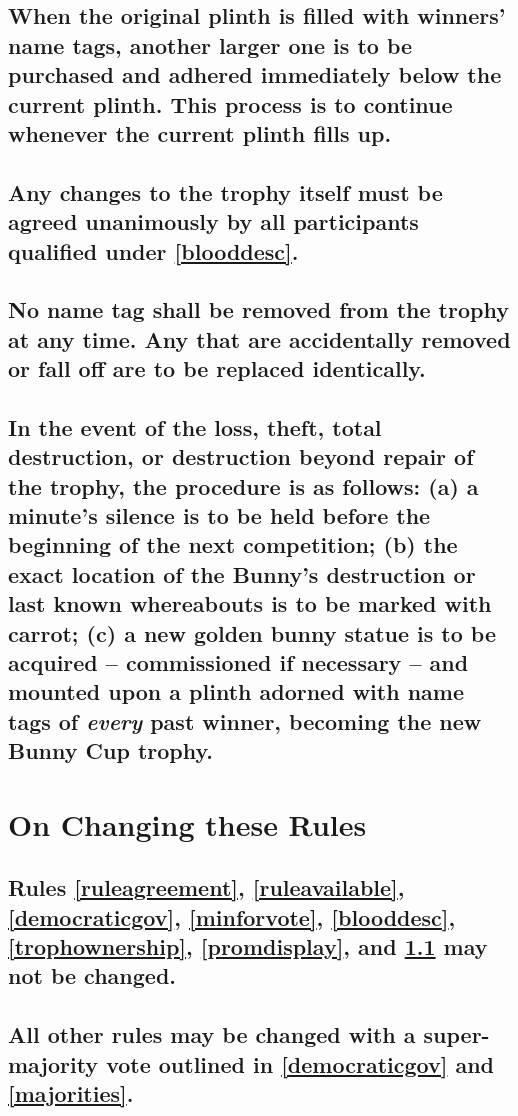 \documentclass[a4paper]{article}
\begin{document}
\subsection{When the original plinth is filled with winners’ name tags, another larger one is to be purchased and adhered immediately below the current plinth. This process is to continue whenever the current plinth fills up.}
\subsection{Any changes to the trophy itself must be agreed unanimously by all participants qualified under \ref{blooddesc}.}
\subsection{No name tag shall be removed from the trophy at any time. Any that are accidentally removed or fall off are to be replaced identically.}
\subsection{In the event of the loss, theft, total destruction, or destruction beyond repair of the trophy, the procedure is as follows: (a) a minute's silence is to be held before the beginning of the next competition; (b) the exact location of the Bunny's destruction or last known whereabouts is to be marked with carrot; (c) a new golden bunny statue is to be acquired – commissioned if necessary – and mounted upon a plinth adorned with name tags of \emph{every} past winner, becoming the new Bunny Cup trophy.}




\section{On Changing these Rules}
\subsection{Rules \ref{ruleagreement}, \ref{ruleavailable}, \ref{democraticgov}, \ref{minforvote}, \ref{blooddesc}, \ref{trophownership}, \ref{promdisplay}, and \ref{protectedrules} may not be changed.}\label{protectedrules}
\subsection{All other rules may be changed with a super-majority vote outlined in \ref{democraticgov} and \ref{majorities}.}\label{rulechange}
\end{document}
